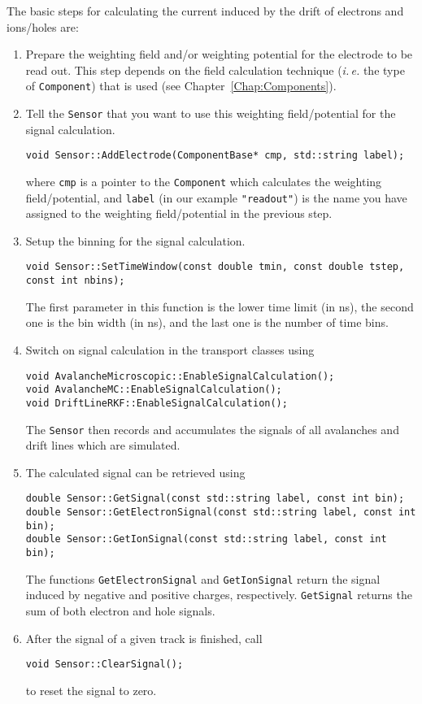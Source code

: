 The basic steps for calculating the current induced 
by the drift of electrons and ions/holes are:
\begin{enumerate}
  \item
  Prepare the weighting field and/or weighting potential 
  for the electrode to be read out. 
  This step depends on the field calculation technique 
  (\textit{i.\,e.} the type of \texttt{Component}) that is used 
  (see Chapter~\ref{Chap:Components}). 
  \item
  Tell the \texttt{Sensor} that you want to use this 
  weighting field/potential for the signal calculation. 
\begin{lstlisting}
void Sensor::AddElectrode(ComponentBase* cmp, std::string label);
\end{lstlisting}
  where \texttt{cmp} is a pointer to the \texttt{Component} 
  which calculates the weighting field/potential, and \texttt{label} 
  (in our example \texttt{"readout"}) is the name 
  you have assigned to the weighting field/potential in the previous step.
  \item
  Setup the binning for the signal calculation.
\begin{lstlisting}
void Sensor::SetTimeWindow(const double tmin, const double tstep, const int nbins);
\end{lstlisting}
  The first parameter in this function is the lower time limit (in ns), 
  the second one is the bin width (in ns), and the last one 
  is the number of time bins.
  \item
  Switch on signal calculation in the transport classes using 
\begin{lstlisting}
void AvalancheMicroscopic::EnableSignalCalculation();
void AvalancheMC::EnableSignalCalculation();
void DriftLineRKF::EnableSignalCalculation();
\end{lstlisting}
  The \texttt{Sensor} then records and accumulates the signals of all 
  avalanches and drift lines which are simulated.
  \item
  The calculated signal can be retrieved using 
\begin{lstlisting}
double Sensor::GetSignal(const std::string label, const int bin);
double Sensor::GetElectronSignal(const std::string label, const int bin);
double Sensor::GetIonSignal(const std::string label, const int bin); 
\end{lstlisting}
  The functions \texttt{GetElectronSignal} and 
  \texttt{GetIonSignal} return the signal induced by negative 
  and positive charges, respectively. \texttt{GetSignal} returns 
  the sum of both electron and hole signals.   
  \item
  After the signal of a given track is finished, call
\begin{lstlisting}
void Sensor::ClearSignal();
\end{lstlisting}
  to reset the signal to zero.
\end{enumerate}

